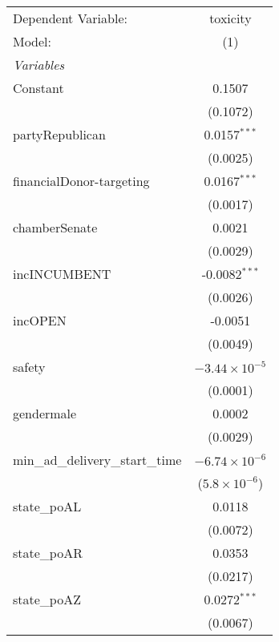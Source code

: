 
\begingroup
\centering
\begin{tabular}{lc}
   \tabularnewline \midrule \midrule
   Dependent Variable:                & toxicity\\  
   Model:                             & (1)\\  
   \midrule
   \emph{Variables}\\
   Constant                           & 0.1507\\   
                                      & (0.1072)\\   
   partyRepublican                    & 0.0157$^{***}$\\   
                                      & (0.0025)\\   
   financialDonor-targeting           & 0.0167$^{***}$\\   
                                      & (0.0017)\\   
   chamberSenate                      & 0.0021\\   
                                      & (0.0029)\\   
   incINCUMBENT                       & -0.0082$^{***}$\\   
                                      & (0.0026)\\   
   incOPEN                            & -0.0051\\   
                                      & (0.0049)\\   
   safety                             & $-3.44\times 10^{-5}$\\    
                                      & (0.0001)\\   
   gendermale                         & 0.0002\\   
                                      & (0.0029)\\   
   min\_ad\_delivery\_start\_time     & $-6.74\times 10^{-6}$\\    
                                      & ($5.8\times 10^{-6}$)\\    
   state\_poAL                        & 0.0118\\   
                                      & (0.0072)\\   
   state\_poAR                        & 0.0353\\   
                                      & (0.0217)\\   
   state\_poAZ                        & 0.0272$^{***}$\\   
                                      & (0.0067)\\   

\end{tabular}
